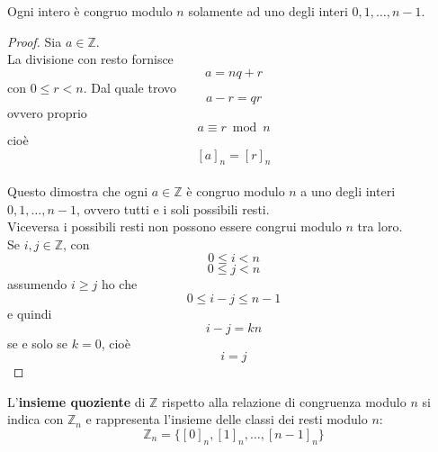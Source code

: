 \documentclass[a4paper,12pt, oneside]{book}
\begin{document}
\begin{osservazione}
	Ogni intero è congruo modulo $n$ solamente ad uno degli interi $0,1,\dots,n-1$.

	\begin{proof}
		Sia $a \in \mathbb{Z}$.\\
		La divisione con resto fornisce
		$$a=nq+r$$ con $0 \leq r < n$. Dal quale trovo
		$$a-r=qr$$ ovvero proprio $$a \equiv r \bmod n$$
		cioè $$[a]_n = [r]_n$$\\
		Questo dimostra che ogni $a \in \mathbb{Z}$ è congruo modulo $n$ a uno degli interi $0,1,\dots,n-1$, ovvero tutti e i soli possibili resti.\\

		Viceversa i possibili resti non possono essere congrui modulo $n$ tra loro.\\Se $i,j \in \mathbb{Z}$, con $$0 \leq i < n$$ $$0 \leq j < n$$ assumendo $i \geq j$ ho che $$0 \leq i-j \leq n-1$$
		e quindi $$i − j = kn$$ se e solo se $k = 0$, cioè $$i = j$$
	\end{proof}
\end{osservazione}
\begin{definizione}
	L'\textbf{insieme quoziente} di $\mathbb{Z}$ rispetto alla relazione di congruenza modulo $n$ si indica con $\mathbb{Z}_n$ e rappresenta l'insieme delle classi dei resti modulo $n$:
	$$\mathbb{Z}_n = \{ [0]_n,[1]_n,\dots,[n-1]_n \}$$
\end{definizione}
\end{document}
